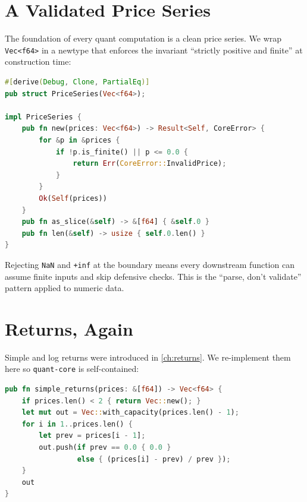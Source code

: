 \section{A Validated Price Series}


The foundation of every quant computation is a clean price series. We wrap
\texttt{Vec<f64>} in a newtype that enforces the invariant ``strictly positive
and finite'' at construction time:

\begin{lstlisting}[language=Rust]
#[derive(Debug, Clone, PartialEq)]
pub struct PriceSeries(Vec<f64>);

impl PriceSeries {
    pub fn new(prices: Vec<f64>) -> Result<Self, CoreError> {
        for &p in &prices {
            if !p.is_finite() || p <= 0.0 {
                return Err(CoreError::InvalidPrice);
            }
        }
        Ok(Self(prices))
    }
    pub fn as_slice(&self) -> &[f64] { &self.0 }
    pub fn len(&self) -> usize { self.0.len() }
}
\end{lstlisting}

Rejecting \texttt{NaN} and \texttt{+inf} at the boundary means every downstream
function can assume finite inputs and skip defensive checks. This is the
``parse, don't validate'' pattern applied to numeric data.

\section{Returns, Again}


Simple and log returns were introduced in \cref{ch:returns}. We re-implement
them here so \texttt{quant-core} is self-contained:

\begin{lstlisting}[language=Rust]
pub fn simple_returns(prices: &[f64]) -> Vec<f64> {
    if prices.len() < 2 { return Vec::new(); }
    let mut out = Vec::with_capacity(prices.len() - 1);
    for i in 1..prices.len() {
        let prev = prices[i - 1];
        out.push(if prev == 0.0 { 0.0 }
                 else { (prices[i] - prev) / prev });
    }
    out
}
\end{lstlisting}

